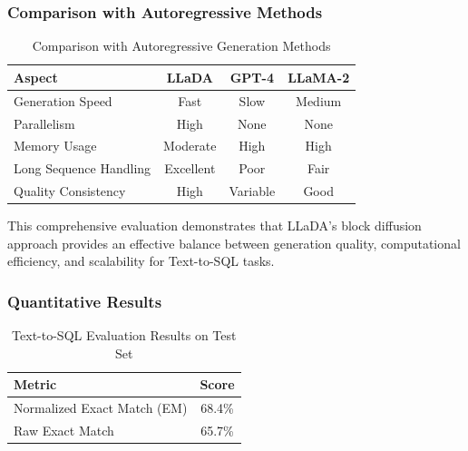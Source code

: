 \documentclass[a4paper,12pt]{article}
\begin{document}
\subsubsection*{Comparison with Autoregressive Methods}
\begin{table}[H]
    \centering
    \begin{tabular}{lccc}
        \toprule
        \textbf{Aspect} & \textbf{LLaDA} & \textbf{GPT-4} & \textbf{LLaMA-2} \\
        \midrule
        Generation Speed & Fast & Slow & Medium \\
        Parallelism & High & None & None \\
        Memory Usage & Moderate & High & High \\
        Long Sequence Handling & Excellent & Poor & Fair \\
        Quality Consistency & High & Variable & Good \\
        \bottomrule
    \end{tabular}
    \caption{Comparison with Autoregressive Generation Methods}
\end{table}

This comprehensive evaluation demonstrates that LLaDA's block diffusion approach provides an effective balance between generation quality, computational efficiency, and scalability for Text-to-SQL tasks.

\subsubsection*{Quantitative Results}
\begin{table}[H]
    \centering
    \begin{tabular}{lc}
        \toprule
        \textbf{Metric} & \textbf{Score} \\
        \midrule
        Normalized Exact Match (EM) & 68.4\% \\
        Raw Exact Match & 65.7\% \\
        \bottomrule
    \end{tabular}
    \caption{Text-to-SQL Evaluation Results on Test Set}
\end{table}
\end{document}
